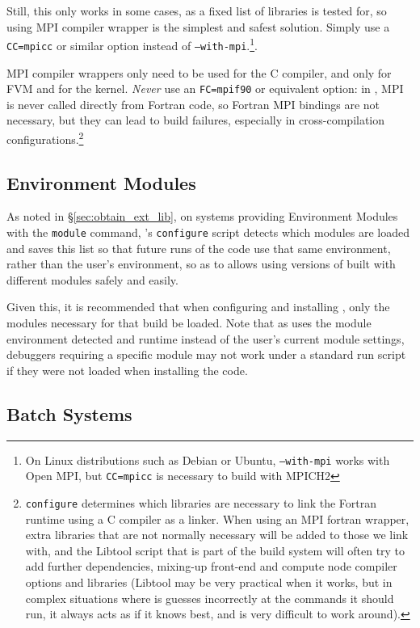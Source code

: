 \documentclass[a4paper,10pt,twoside]{article}
\begin{document}
Still, this only works in some cases, as a fixed list of libraries
is tested for, so using MPI compiler wrapper is the simplest and safest
solution. Simply use a \texttt{CC=mpicc} or similar option instead
of \texttt{--with-mpi}.\footnote{On Linux distributions such
as Debian or Ubuntu, \texttt{--with-mpi} works with Open MPI, but
\texttt{CC=mpicc} is necessary to build with MPICH2}.

MPI compiler wrappers only need to be used for the C compiler,
and only for FVM and for the kernel.
\emph{Never} use an \texttt{FC=mpif90}
or equivalent option: in \CS, MPI is never called directly from Fortran code,
so Fortran MPI bindings are not necessary, but they can lead to
build failures, especially in cross-compilation
configurations.\footnote{\texttt{configure} determines which libraries are
necessary to link the Fortran runtime using a C compiler as a linker.
When using an MPI fortran wrapper, extra libraries that are not normally
necessary will be added to those we link with, and the Libtool script
that is part of the build system will often try to add further dependencies,
mixing-up front-end and compute node compiler options and
libraries (Libtool may be very practical when it works, but in complex
situations where is guesses incorrectly at the commands it should run, it always
acts as if it knows best, and is very difficult to work around).}

\subsection{Environment Modules\label{sec:config:envmode}}

As noted in \S\ref{sec:obtain_ext_lib}, on systems providing
Environment Modules with the {\tt module} command, \CS's {\tt configure}
script detects which modules are loaded and saves
this list so that future runs of the code use that same environment,
rather than the user's environment, so as to allows using versions of
\CS built with different modules safely and easily.

Given this, it is recommended that when configuring and installing
\CS, only the modules necessary for that build be loaded.
Note that as \CS uses the module
environment detected and runtime instead of the user's current
module settings, debuggers requiring a specific module may
not work under a standard run script if they were not loaded when
installing the code.

\subsection{Batch Systems\label{sec:config:batch}}
\end{document}
